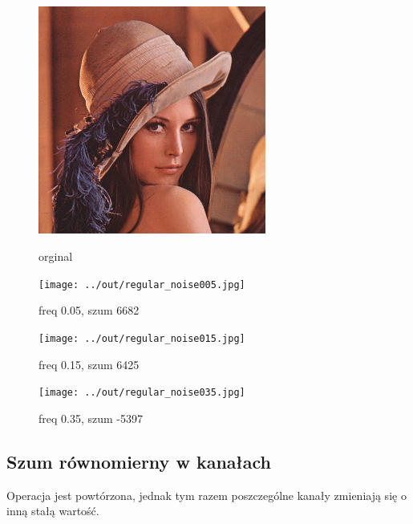 \documentclass[a4paper,12pt]{article}
\begin{document}


\newpage
\begin{figure}[h!]
\begin{minipage}[t]{7.5cm}
\begin{center}
\includegraphics[width=7.5cm,clip]{../../lena.jpg}
\caption{orginal}
\end{center}
\end{minipage}
\hfill
\begin{minipage}[t]{7.5cm}
\begin{center}
\texttt{[image: ../out/regular\_noise005.jpg]}
\caption{freq 0.05, szum 6682}
\end{center}
\end{minipage}
\end{figure}

\begin{figure}[h!]
\begin{minipage}[t]{7.5cm}
\begin{center}
\texttt{[image: ../out/regular\_noise015.jpg]}
\caption{freq 0.15, szum 6425}
\end{center}
\end{minipage}
\hfill
\begin{minipage}[t]{7.5cm}
\begin{center}
\texttt{[image: ../out/regular\_noise035.jpg]}
\caption{freq 0.35, szum -5397}
\end{center}
\end{minipage}
\end{figure}


\newpage
\subsection{Szum równomierny w kanałach}
Operacja jest powtórzona, jednak tym razem poszczególne kanały zmieniają się o inną stałą wartość.
\end{document}
